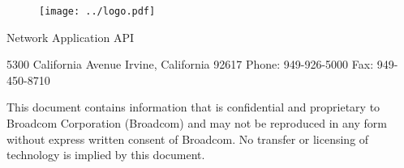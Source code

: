 \documentclass[oneside,letterpaper]{book}
\begin{document}
\begin{titlepage}
\begin{figure}[htbp]
\centerline{\texttt{[image: ../logo.pdf]}}
\label{fig1}
\end{figure}

\vspace*{7cm}
\begin{center}
{\Large Network Application API}\\
\end{center}

\vspace*{2in}
5300 California Avenue Irvine, California 92617 Phone: 949-926-5000      
Fax: 949-450-8710

This document contains information that is confidential and proprietary to 
Broadcom Corporation (Broadcom) and may not be reproduced in any form 
without express written consent of Broadcom. No transfer or licensing of 
technology is implied by this document.
\end{titlepage}
\clearemptydoublepage
{}
\tableofcontents
\clearemptydoublepage
{}
\end{document}
